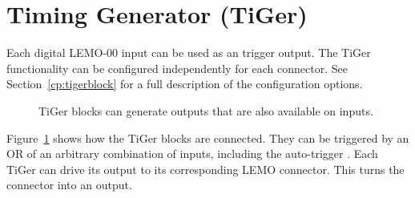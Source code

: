 \section{Timing Generator (TiGer)\label{cp:tiger}}
Each digital LEMO-00 input can be used as an 
trigger output. The TiGer functionality can be configured independently for
each connector. See Section~\ref{cp:tigerblock} for a full description of the
configuration options.
% 
\begin{figure}[ht]
    \centering
    \caption{TiGer blocks can generate outputs that are also available on
        inputs.\label{fig:matrix}} 
\end{figure}
%

Figure~\ref{fig:matrix} shows how the TiGer blocks are connected. They can be
triggered by an OR of an arbitrary combination of inputs, including the
auto-trigger . Each TiGer can drive its output to its
corresponding LEMO connector. This turns the connector into an output. 

